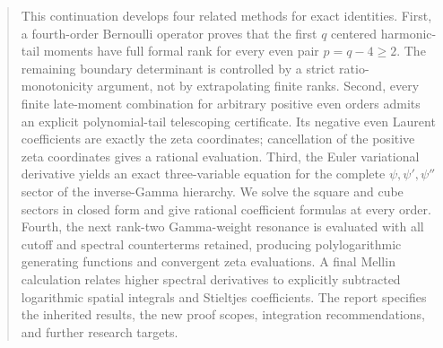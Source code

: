 \documentclass[11pt,letterpaper]{article}
\numberwithin{equation}{section}
\theoremstyle{plain}
\theoremstyle{definition}
\theoremstyle{remark}
\begin{document}
\begin{abstract}
This continuation develops four related methods for exact identities.
First, a fourth-order Bernoulli operator proves that the first $q$
centered harmonic-tail moments have full formal rank for every even pair
$p=q-4\ge2$. The remaining boundary determinant is controlled by a
strict ratio-monotonicity argument, not by extrapolating finite ranks.
Second, every finite late-moment combination for arbitrary positive even
orders admits an explicit polynomial-tail telescoping certificate.
Its negative even Laurent coefficients are exactly the zeta coordinates;
cancellation of the positive zeta coordinates gives a rational
evaluation. Third, the Euler variational derivative yields an exact
three-variable equation for the complete $\psi,\psi',\psi''$ sector of
the inverse-Gamma hierarchy. We solve the square and cube sectors in
closed form and give rational coefficient formulas at every order.
Fourth, the next rank-two Gamma-weight resonance is evaluated with all
cutoff and spectral counterterms retained, producing polylogarithmic
generating functions and convergent zeta evaluations. A final Mellin
calculation relates higher spectral derivatives to explicitly subtracted
logarithmic spatial integrals and Stieltjes coefficients. The report
specifies the inherited results, the new proof scopes, integration
recommendations, and further research targets.
\end{abstract}
\tableofcontents
\clearpage
{}









\end{document}
